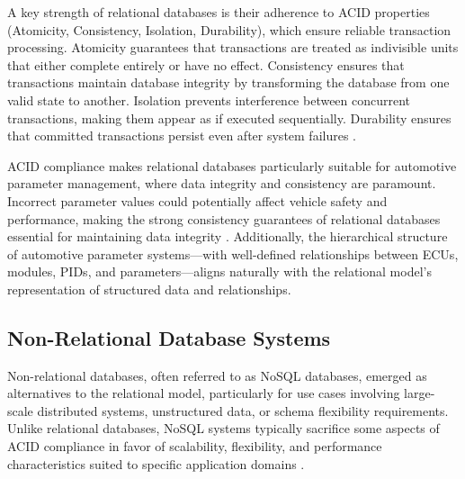 A key strength of relational databases is their adherence to ACID properties (Atomicity, Consistency, Isolation, Durability), which ensure reliable transaction processing. Atomicity guarantees that transactions are treated as indivisible units that either complete entirely or have no effect. Consistency ensures that transactions maintain database integrity by transforming the database from one valid state to another. Isolation prevents interference between concurrent transactions, making them appear as if executed sequentially. Durability ensures that committed transactions persist even after system failures \cite{elmasri2015fundamentals}.

ACID compliance makes relational databases particularly suitable for automotive parameter management, where data integrity and consistency are paramount. Incorrect parameter values could potentially affect vehicle safety and performance, making the strong consistency guarantees of relational databases essential for maintaining data integrity \cite{staron2021automotive}. Additionally, the hierarchical structure of automotive parameter systems—with well-defined relationships between \acp{ECU}, modules, \acp{PID}, and parameters—aligns naturally with the relational model's representation of structured data and relationships.

\subsection{Non-Relational Database Systems}
\label{subsec:non-relational-database-systems}

Non-relational databases, often referred to as \ac{NoSQL} databases, emerged as alternatives to the relational model, particularly for use cases involving large-scale distributed systems, unstructured data, or schema flexibility requirements. Unlike relational databases, NoSQL systems typically sacrifice some aspects of ACID compliance in favor of scalability, flexibility, and performance characteristics suited to specific application domains \cite{bhattacherjee2015principles}.

